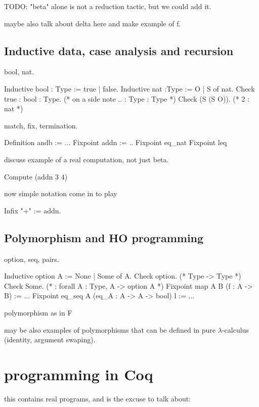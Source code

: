TODO: "beta" alone is not a reduction tactic, but we could add it.

maybe also talk about delta here and make example of f.

\subsection{Inductive data, case analysis and recursion}
bool, nat.

\begin{coq}{}
Inductive bool : Type := true | false.
Inductive nat :Type := O | S of nat.
Check true : bool : Type. (* on a side note .. : Type : Type *)
Check (S (S O)). (* 2 : nat *)
\end{coq}

match, fix, termination.

\begin{coq}{}
Definition andb := ...
Fixpoint addn := ..
Fixpoint eq_nat
Fixpoint leq
\end{coq}

discuss example of a real computation, not just beta.

\begin{coq}{}
Compute (addn 3 4)
\end{coq}

now simple notation come in to play

\begin{coq}{}
Infix "+" := addn.
\end{coq}

\subsection{Polymorphism and HO programming}
option, seq, pairs.

\begin{coq}{}
Inductive option A := None | Some of A.
Check option. (* Type -> Type *)
Check Some. (* : forall A : Type, A -> option A *)
Fixpoint map A B (f : A -> B) := ...
Fixpoint eq_seq A (eq_A : A -> A -> bool) l := ...
\end{coq}

polymorphism as in F

may be also examples of polymorphisms that can be defined in pure
$\lambda$-calculus (identity, argument swaping).

\section{programming in Coq}
this contains real programs, and is the excuse to talk about:

